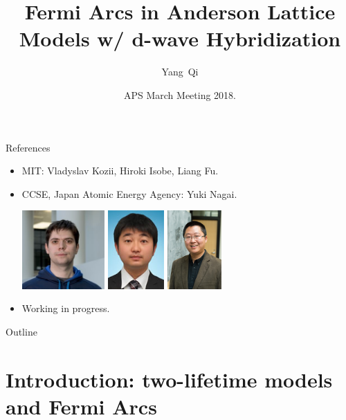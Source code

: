 \documentclass[xcolor=table, 10pt, aspectratio=169]{beamer}
\title[Fermi Arcs] %
{Fermi Arcs in Anderson Lattice Models w/ d-wave Hybridization}
\author[Y Qi] %
{Yang~Qi}
\institute[Fudan] %
{Department of Physics, Fudan University}
\date{APS March Meeting 2018.}
\begin{document}
\begin{frame}
  \titlepage
\end{frame}

\begin{frame}{References}
\begin{itemize}
\item MIT: Vladyslav Kozii, Hiroki Isobe, Liang Fu.
\item CCSE, Japan Atomic Energy Agency: Yuki Nagai.
\begin{center}
	\includegraphics[height=3cm]{../people/vlad}
	\includegraphics[height=3cm]{../people/yuki}
	\includegraphics[height=3cm]{../people/liangfu}
\end{center}
\item Working in progress.
\end{itemize}
\end{frame}

\begin{frame}{Outline}
		\tableofcontents
\end{frame}

\section{Introduction: two-lifetime models and Fermi Arcs}
\end{document}
